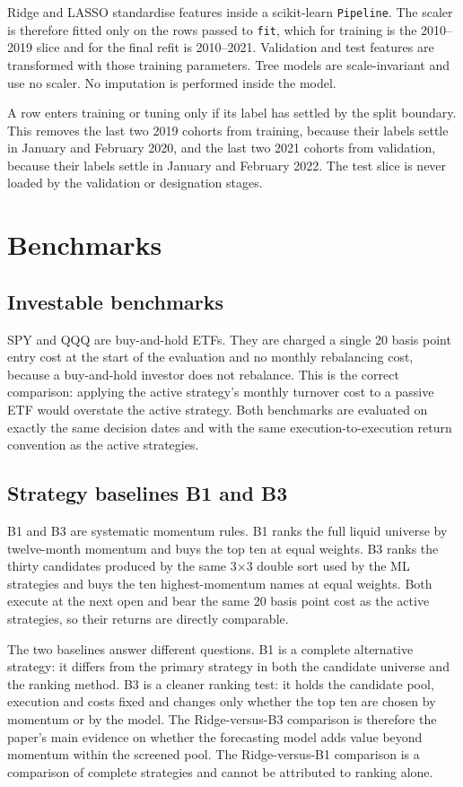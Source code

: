 \documentclass[11pt,a4paper]{article}
\begin{document}
Ridge and LASSO standardise features inside a scikit-learn \texttt{Pipeline}. The scaler is therefore fitted only on the rows passed to \texttt{fit}, which for training is the 2010--2019 slice and for the final refit is 2010--2021. Validation and test features are transformed with those training parameters. Tree models are scale-invariant and use no scaler. No imputation is performed inside the model.

A row enters training or tuning only if its label has settled by the split boundary. This removes the last two 2019 cohorts from training, because their labels settle in January and February 2020, and the last two 2021 cohorts from validation, because their labels settle in January and February 2022. The test slice is never loaded by the validation or designation stages.


\section{Benchmarks}
\label{sec:benchmarks}

\subsection{Investable benchmarks}

SPY and QQQ are buy-and-hold ETFs. They are charged a single 20 basis point entry cost at the start of the evaluation and no monthly rebalancing cost, because a buy-and-hold investor does not rebalance. This is the correct comparison: applying the active strategy's monthly turnover cost to a passive ETF would overstate the active strategy. Both benchmarks are evaluated on exactly the same decision dates and with the same execution-to-execution return convention as the active strategies.

\subsection{Strategy baselines B1 and B3}

B1 and B3 are systematic momentum rules. B1 ranks the full liquid universe by twelve-month momentum and buys the top ten at equal weights. B3 ranks the thirty candidates produced by the same 3$\times$3 double sort used by the ML strategies and buys the ten highest-momentum names at equal weights. Both execute at the next open and bear the same 20 basis point cost as the active strategies, so their returns are directly comparable.

The two baselines answer different questions. B1 is a complete alternative strategy: it differs from the primary strategy in both the candidate universe and the ranking method. B3 is a cleaner ranking test: it holds the candidate pool, execution and costs fixed and changes only whether the top ten are chosen by momentum or by the model. The Ridge-versus-B3 comparison is therefore the paper's main evidence on whether the forecasting model adds value beyond momentum within the screened pool. The Ridge-versus-B1 comparison is a comparison of complete strategies and cannot be attributed to ranking alone.
\end{document}

